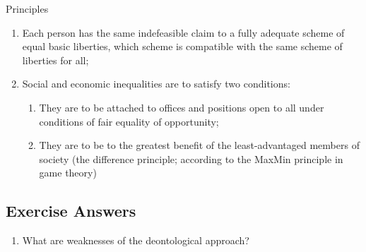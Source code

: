 \documentclass[11pt]{article}
\theoremstyle{definition}
\begin{document}
Principles
\begin{enumerate}
	\item Each person has the same indefeasible claim to a fully adequate scheme of equal basic liberties, which scheme is compatible with the same scheme of liberties for all;
	\item Social and economic inequalities are to satisfy two conditions:
	\begin{enumerate}
		\item They are to be attached to offices and positions open to all under conditions of fair equality of opportunity;
		\item They are to be to the greatest benefit of the least-advantaged members of society (the difference principle; according to the MaxMin principle in game theory)
	\end{enumerate}
\end{enumerate}

\subsection{Exercise Answers}
\begin{enumerate}
	\item What are weaknesses of the deontological approach?
\end{enumerate}


\printbibliography
\end{document}
